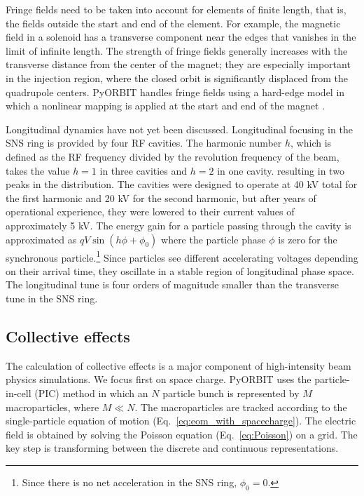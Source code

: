 Fringe fields need to be taken into account for elements of finite length, that is, the fields outside the start and end of the element. For example, the magnetic field in a solenoid has a transverse component near the edges that vanishes in the limit of infinite length. The strength of fringe fields generally increases with the transverse distance from the center of the magnet; they are especially important in the injection region, where the closed orbit is significantly displaced from the quadrupole centers. PyORBIT handles fringe fields using a hard-edge model in which a nonlinear mapping is applied at the start and end of the magnet \cite{Forest1998}.

Longitudinal dynamics have not yet been discussed. Longitudinal focusing in the SNS ring is provided by four RF cavities. The harmonic number $h$, which is defined as the RF frequency divided by the revolution frequency of the beam, takes the value $h = 1$ in three cavities and $h = 2$ in one cavity. resulting in two peaks in the distribution. The cavities were designed to operate at 40 kV total for the first harmonic and 20 kV for the second harmonic, but after years of operational experience, they were lowered to their current values of approximately 5 kV. The energy gain for a particle passing through the cavity is approximated as $q V \sin(h \phi + \phi_0)$ where the particle phase $\phi$ is zero for the synchronous particle.\footnote{Since there is no net acceleration in the SNS ring, $\phi_0 = 0$.} Since particles see different accelerating voltages depending on their arrival time, they oscillate in a stable region of longitudinal phase space. The longitudinal tune is four orders of magnitude smaller than the transverse tune in the SNS ring.



\subsection{Collective effects}

The calculation of collective effects is a major component of high-intensity beam physics simulations. We focus first on space charge. PyORBIT uses the particle-in-cell (PIC) method in which an $N$ particle bunch is represented by $M$ macroparticles, where $M \ll N$. The macroparticles are tracked according to the single-particle equation of motion (Eq.~\eqref{eq:eom_with_spacecharge}). The electric field is obtained by solving the Poisson equation (Eq.~\eqref{eq:Poisson}) on a grid. The key step is transforming between the discrete and continuous representations. 

